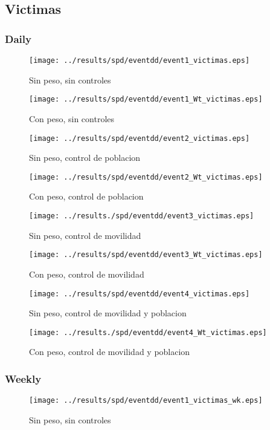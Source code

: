 \documentclass[11pt,letterpaper]{article}
\begin{document}
	\subsection{Victimas}
		\subsubsection{Daily}
\begin{figure}[H]
\caption{Sin peso, sin controles}
\centering
\texttt{[image: ../results/spd/eventdd/event1\_victimas.eps]}
\end{figure}

\begin{figure}[H]
\caption{Con peso, sin controles}
\centering
\texttt{[image: ../results/spd/eventdd/event1\_Wt\_victimas.eps]}
\end{figure}
\begin{figure}[H]
\caption{Sin peso, control de poblacion}
\centering
\texttt{[image: ../results/spd/eventdd/event2\_victimas.eps]}
\end{figure}

\begin{figure}[H]
\caption{Con peso, control de poblacion}
\centering
\texttt{[image: ../results/spd/eventdd/event2\_Wt\_victimas.eps]}
\end{figure}
\begin{figure}[H]
\caption{Sin peso, control de movilidad}
\centering
\texttt{[image: ../results./spd/eventdd/event3\_victimas.eps]}
\end{figure}

\begin{figure}[H]
\caption{Con peso, control de movilidad}
\centering
\texttt{[image: ../results/spd/eventdd/event3\_Wt\_victimas.eps]}
\end{figure}
\begin{figure}[H]
\caption{Sin peso, control de movilidad y poblacion}
\centering
\texttt{[image: ../results/spd/eventdd/event4\_victimas.eps]}
\end{figure}

\begin{figure}[H]
\caption{Con peso, control de movilidad y poblacion}
\centering
\texttt{[image: ../results./spd/eventdd/event4\_Wt\_victimas.eps]}
\end{figure}

		\subsubsection{Weekly}
\begin{figure}[H]
\caption{Sin peso, sin controles}
\centering
\texttt{[image: ../results/spd/eventdd/event1\_victimas\_wk.eps]}
\end{figure}
\end{document}
